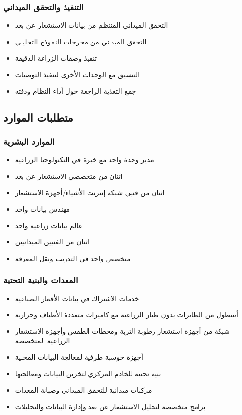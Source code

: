 \subsubsection{التنفيذ والتحقق الميداني}
\begin{itemize}
    \item التحقق الميداني المنتظم من بيانات الاستشعار عن بعد
    \item التحقق الميداني من مخرجات النموذج التحليلي
    \item تنفيذ وصفات الزراعة الدقيقة
    \item التنسيق مع الوحدات الأخرى لتنفيذ التوصيات
    \item جمع التغذية الراجعة حول أداء النظام ودقته
\end{itemize}

\subsection{متطلبات الموارد}

\subsubsection{الموارد البشرية}
\begin{itemize}
    \item مدير وحدة واحد مع خبرة في التكنولوجيا الزراعية
    \item اثنان من متخصصي الاستشعار عن بعد
    \item اثنان من فنيي شبكة إنترنت الأشياء/أجهزة الاستشعار
    \item مهندس بيانات واحد
    \item عالم بيانات زراعية واحد
    \item اثنان من الفنيين الميدانيين
    \item متخصص واحد في التدريب ونقل المعرفة
\end{itemize}

\subsubsection{المعدات والبنية التحتية}
\begin{itemize}
    \item خدمات الاشتراك في بيانات الأقمار الصناعية
    \item أسطول من الطائرات بدون طيار الزراعية مع كاميرات متعددة الأطياف وحرارية
    \item شبكة من أجهزة استشعار رطوبة التربة ومحطات الطقس وأجهزة الاستشعار الزراعية المتخصصة
    \item أجهزة حوسبة طرفية لمعالجة البيانات المحلية
    \item بنية تحتية للخادم المركزي لتخزين البيانات ومعالجتها
    \item مركبات ميدانية للتحقق الميداني وصيانة المعدات
    \item برامج متخصصة لتحليل الاستشعار عن بعد وإدارة البيانات والتحليلات
\end{itemize}

